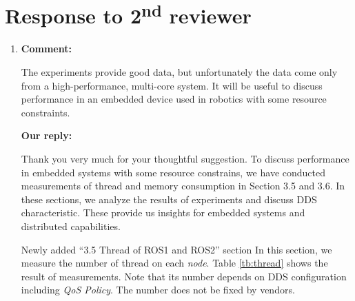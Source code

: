 \documentclass{article}
\newcommand\nd{\textsuperscript{nd}\xspace}
\begin{document}
\begin{itemize}
\end{itemize}

\newpage

\section{Response to 2\nd reviewer}
\begin{enumerate}

\item \begin{flushleft}
    \textbf{Comment:}
  \end{flushleft}
  The experiments provide good data, but unfortunately the data come only from a high-performance, multi-core system. 
  It will be useful to discuss performance in an embedded device used in robotics with some resource constraints.

  \begin{flushleft}
    \textbf{Our reply:}
  \end{flushleft}
  Thank you very much for your thoughtful suggestion.
  To discuss performance in embedded systems with some resource constrains, we have conducted measurements of thread and memory consumption in Section 3.5 and 3.6.
  In these sections, we analyze the results of experiments and discuss DDS characteristic.
  These provide us insights for embedded systems and distributed capabilities.
  \begin{itembox}[|]{Newly added ``3.5 Thread of ROS1 and ROS2'' section}
    In this section, we measure the number of thread on each \emph{node}.
    Table \ref{tb:thread} shows the result of measurements.
    Note that its number depends on DDS configuration including \emph{QoS Policy}.
    The number does not be fixed by vendors.


\end{itembox}
\end{enumerate}
\end{document}
